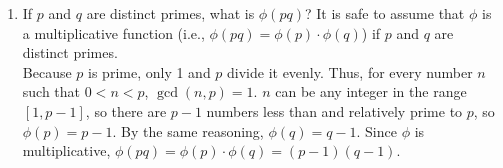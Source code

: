 \documentclass{article}
\begin{document}
\begin{enumerate}
\begin{enumerate}
    \end{enumerate}
    \item If $p$ and $q$ are distinct primes, what is $\phi(pq)$? It is safe to assume that $\phi$ is a multiplicative function (i.e., $\phi(pq) = \phi(p) \cdot \phi(q)$) if $p$ and $q$ are distinct primes.\\
    Because $p$ is prime, only 1 and $p$ divide it evenly. Thus, for every number $n$ such that $0 < n < p$, $\gcd(n, p) = 1$. $n$ can be any integer in the range $[1, p-1]$, so there are $p - 1$ numbers less than and relatively prime to $p$, so $\phi(p) = p - 1$. By the same reasoning, $\phi(q) = q - 1$. Since $\phi$ is multiplicative, $\phi(pq) = \phi(p) \cdot \phi(q) = (p - 1)(q - 1)$.
\end{enumerate}
\end{document}
